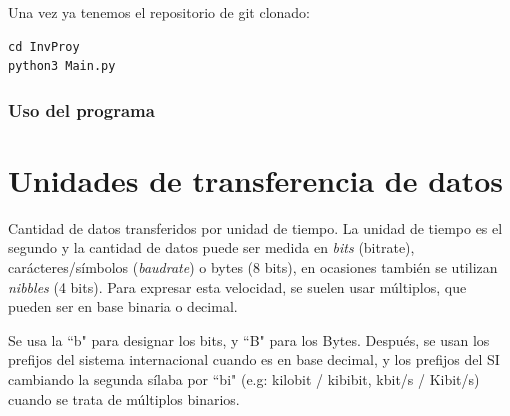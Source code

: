 \documentclass[a4paper, 11pt]{report} %
\begin{document}
\noindent Una vez ya tenemos el repositorio de git clonado:
\begin{verbatim}
cd InvProy
python3 Main.py
\end{verbatim}
\subsection{Uso del programa}



\glsaddall
\renewcommand{\glsnamefont}[1]{\makefirstuc{#1}}
\printglossary[style=mcolindex, title=Glosario y acrónimos, toctitle=Glosario y acrónimos]

\nocite{*}
\printbibliography

\listoffigures

\appendix
\chapter{Unidades de transferencia de datos}
Cantidad de datos transferidos por unidad de tiempo. La unidad de tiempo es el segundo y la cantidad de datos puede ser medida en \textit{\glspl{bit}} (bitrate), carácteres/símbolos (\textit{baudrate}) o bytes (8 bits), en ocasiones también se utilizan \textit{nibbles} (4 bits). Para expresar esta velocidad, se suelen usar múltiplos, que pueden ser en base binaria o decimal.

Se usa la ``b" para designar los bits, y ``B" para los Bytes. Después, se usan los prefijos del sistema internacional cuando es en base decimal, y los prefijos del SI cambiando la segunda sílaba por ``bi" (e.g: kilobit / kibibit, kbit/s / Kibit/s) cuando se trata de múltiplos binarios.
\end{document}

